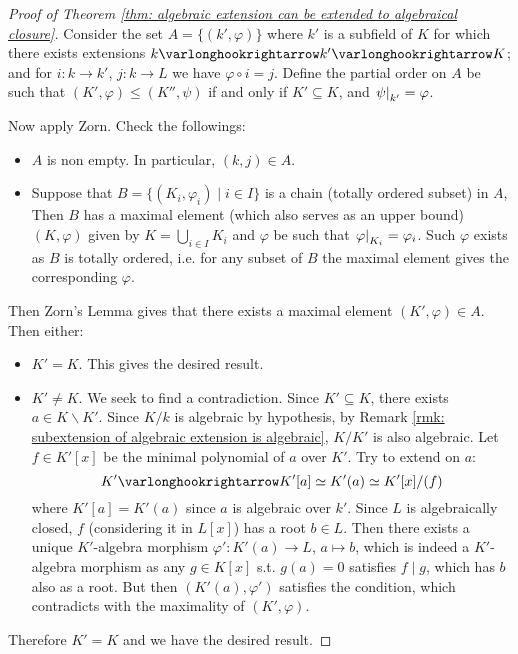 \documentclass{article}
\begin{document}
\begin{proof}[Proof of Theorem \ref{thm: algebraic extension can be extended to algebraical closure}]
    Consider the set $A = \{ (k', \varphi) \}$ where $k'$ is a subfield of $K$ for which there exists extensions $k \ext k' \ext K$; and for $i: k \to k'$, $j: k \to L$ we have $\varphi \circ i = j$. Define the partial order on $A$ be such that $(K', \varphi) \leq (K'', \psi)$ if and only if $K' \subseteq K$, and $\left.\psi\right|_{k'} = \varphi$.

    Now apply Zorn. Check the followings:
    \begin{itemize}
        \item $A$ is non empty. In particular, $(k, j) \in A$.
        \item Suppose that $B = \{ (K_i, \varphi_i) \mid i \in I \}$ is a chain (totally ordered subset) in $A$, Then $B$ has a maximal element (which also serves as an upper bound) $(K, \varphi)$ given by $K = \bigcup_{i \in I} K_i$ and $\varphi$ be such that $\left.\varphi\right|_{K_i} = \varphi_i$. Such $\varphi$ exists as $B$ is totally ordered, i.e. for any subset of $B$ the maximal element gives the corresponding $\varphi$.
    \end{itemize}
    Then Zorn's Lemma gives that there exists a maximal element $(K', \varphi) \in A$. Then either:
    \begin{itemize}
        \item $K' = K$. This gives the desired result. 
        \item $K' \neq K$. We seek to find a contradiction. Since $K' \subseteq K$, there exists $a \in K \smallsetminus K'$. Since $K/k$ is algebraic by hypothesis, by Remark \ref{rmk: subextension of algebraic extension is algebraic}, $K/K'$ is also algebraic. Let $f \in K'[x]$ be the minimal polynomial of $a$ over $K'$. Try to extend on $a$: 
        \[
            K' \ext K'[a] \simeq K'(a) \simeq K'[x]/(f)
        \]
        where $K'[a] = K'(a)$ since $a$ is algebraic over $k'$. Since $L$ is algebraically closed, $f$ (considering it in $L[x]$) has a root $b \in L$. Then there exists a unique $K'$-algebra morphism $\varphi': K'(a) \to L$, $a \mapsto b$, which is indeed a $K'$-algebra morphism as any $g \in K[x]$ s.t. $g(a) = 0$ satisfies $f \mid g$, which has $b$ also as a root. But then $(K'(a), \varphi')$ satisfies the condition, which contradicts with the maximality of $(K', \varphi)$.
    \end{itemize}
    Therefore $K' = K$ and we have the desired result.
\end{proof}
\end{document}

